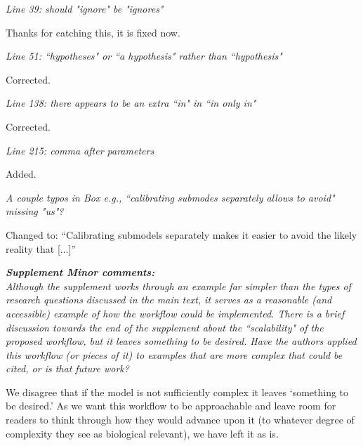 \documentclass[11pt,letter]{article}
\begin{document}
\begin{mybox}
\emph{Line 39: should "ignore" be "ignores"}
\end{mybox}

Thanks for catching this, it is fixed now. 

\begin{mybox}
\emph{Line 51: ``hypotheses" or ``a hypothesis" rather than ``hypothesis"}
\end{mybox}

Corrected.

\begin{mybox}
\emph{Line 138: there appears to be an extra ``in" in ``in only in"}
\end{mybox}

Corrected.

\begin{mybox}
\emph{Line 215: comma after parameters}
\end{mybox}

Added.

\begin{mybox}
\emph{A couple typos in Box e.g., ``calibrating submodes separately allows to
avoid" missing "us"?}
\end{mybox}

Changed to: ``Calibrating submodels separately makes it easier to avoid the likely reality that [...]''

\begin{mybox}
\emph{\textbf{Supplement Minor comments:}\\
Although the supplement works through an example far simpler than the
types of research questions discussed in the main text, it serves as a
reasonable (and accessible) example of how the workflow could be
implemented. There is a brief discussion towards the end of the
supplement about the ``scalability" of the proposed workflow, but it
leaves something to be desired. Have the authors applied this workflow
(or pieces of it) to examples that are more complex that could be cited,
or is that future work?}
\end{mybox}

We disagree that if the model is not sufficiently complex it leaves `something to be desired.' As we want this workflow to be approachable and leave room for readers to think through how they would advance upon it (to whatever degree of complexity they see as biological relevant), we have left it as is.  %
\end{document}
